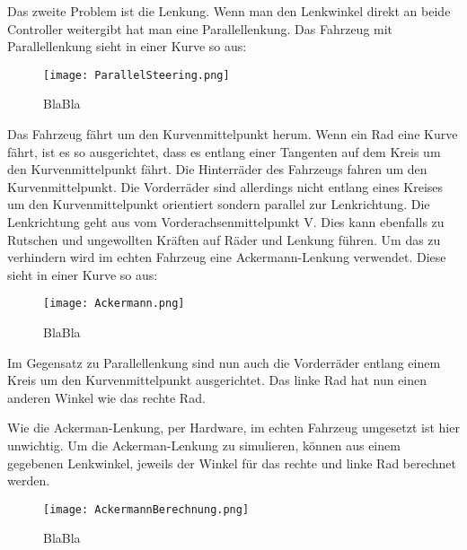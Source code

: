 Das zweite Problem ist die Lenkung. 
Wenn man den Lenkwinkel direkt an beide Controller weitergibt hat man eine Parallellenkung.
Das Fahrzeug mit Parallellenkung sieht in einer Kurve so aus:  
\begin{wrapfigure}{r}{.4\textwidth}
    \centering
    \texttt{[image: ParallelSteering.png]}
    \vspace{-15pt}
    \caption{BlaBla\footnotemark}
\end{wrapfigure}
Das Fahrzeug fährt um den Kurvenmittelpunkt herum. 
Wenn ein Rad eine Kurve fährt, ist es so ausgerichtet, dass es entlang einer Tangenten auf dem Kreis um den Kurvenmittelpunkt fährt.
Die Hinterräder des Fahrzeugs fahren um den Kurvenmittelpunkt.
Die Vorderräder sind allerdings nicht entlang eines Kreises um den Kurvenmittelpunkt orientiert sondern parallel zur Lenkrichtung.
Die Lenkrichtung geht aus vom Vorderachsenmittelpunkt V.
Dies kann ebenfalls zu Rutschen und ungewollten Kräften auf Räder und Lenkung führen.
Um das zu verhindern wird im echten Fahrzeug eine Ackermann-Lenkung verwendet. 
Diese sieht in einer Kurve so aus:
\begin{wrapfigure}{r}{.4\textwidth}
    \centering
    \texttt{[image: Ackermann.png]}
    \vspace{-15pt}
    \caption{BlaBla\footnotemark}
\end{wrapfigure}
Im Gegensatz zu Parallellenkung sind nun auch die Vorderräder entlang einem Kreis um den Kurvenmittelpunkt ausgerichtet.
Das linke Rad hat nun einen anderen Winkel wie das rechte Rad.

Wie die Ackerman-Lenkung, per Hardware, im echten Fahrzeug umgesetzt ist hier unwichtig.
Um die Ackerman-Lenkung zu simulieren, können aus einem gegebenen Lenkwinkel, jeweils der Winkel für das rechte und linke Rad berechnet werden.

\begin{wrapfigure}{r}{.4\textwidth}
    \centering
    \texttt{[image: AckermannBerechnung.png]}
    \vspace{-15pt}
    \caption{BlaBla}
\end{wrapfigure}

